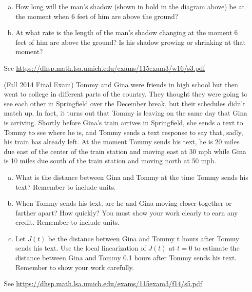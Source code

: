 \documentclass[11pt]{exam}
\begin{document}
\begin{questions}
\begin{center}
\end{center}
\begin{enumerate}[(a)]
\item How long will the man's shadow (shown in bold in the diagram above) be at the moment when 6 feet of him are above the ground?
\item At what rate is the length of the man's shadow changing at the moment 6 feet of him are above the ground? Is his shadow growing or shrinking at that moment?
\end{enumerate}
\begin{solution}
  See \href{https://dhsp.math.lsa.umich.edu/exams/115exam3/w16/s3.pdf}{https://dhsp.math.lsa.umich.edu/exams/115exam3/w16/s3.pdf}
\end{solution}
\question (Fall 2014 Final Exam) %
Tommy and Gina were friends in high school but then went to college in different parts of the country. They thought they were going to see each other in Springfield over the December break, but their schedules didn't match up. In fact, it turns out that Tommy is leaving on the same day that Gina is arriving.
Shortly before Gina's train arrives in Springfield, she sends a text to Tommy to see where he is, and Tommy sends a text response to say that, sadly, his train has already left. At the moment Tommy sends his text, he is 20 miles due east of the center of the train station and moving east at 30 mph while Gina is 10 miles due south of the train station and moving north at 50 mph.
\begin{enumerate}[(a)]
\item What is the distance between Gina and Tommy at the time Tommy sends his text? Remember to include units.
\item When Tommy sends his text, are he and Gina moving closer together or farther apart? How quickly? You must show your work clearly to earn any credit. Remember to include units.
\item Let $J(t)$ be the distance between Gina and Tommy t hours after Tommy sends his text. Use the local linearization of $J(t)$ at $t = 0$ to estimate the distance between Gina and Tommy 0.1 hours after Tommy sends his text. Remember to show your work carefully.
\end{enumerate}
\begin{solution}
  See \href{https://dhsp.math.lsa.umich.edu/exams/115exam3/f14/s5.pdf}{https://dhsp.math.lsa.umich.edu/exams/115exam3/f14/s5.pdf}
\end{solution}
\end{questions}
\end{document}
